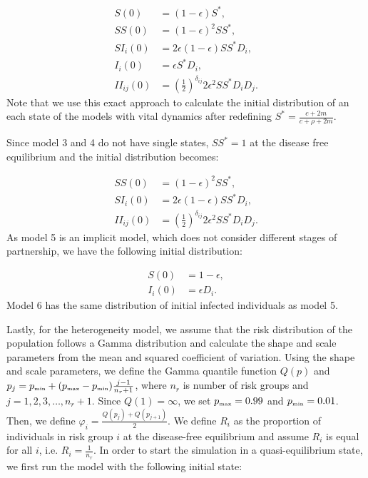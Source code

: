 \documentclass[10pt,letterpaper]{article}
\newcommand{\khalf}{\left(\frac{1}{2}\right)^{\delta_{ij}}}  %
\newcommand{\tsub}[2]{#1_{{\textrm{\tiny #2}}}}
\begin{document}
\begin{equation}
\begin{aligned}
S(0) &= (1 - \epsilon) S^*, \\
SS(0) &= (1 - \epsilon)^2 SS^*,\\
SI_i(0) &= 2 \epsilon (1-\epsilon) SS^* D_i,\\
I_i(0) &=  \epsilon S^* D_i,\\
II_{ij}(0) &=  \khalf 2\epsilon^2 SS^* D_i D_j.
\end{aligned}
\end{equation}
Note that we use this exact approach to calculate the initial distribution of an each state of the models with vital dynamics after redefining $S^* = \frac{c + 2m}{c + \rho + 2m}$.

Since model 3 and 4 do not have single states, $SS^*=1$ at the disease free equilibrium and the initial distribution becomes:

\begin{equation}
\begin{aligned}
SS(0) &= (1 - \epsilon)^2 SS^*,\\
SI_i(0) &= 2 \epsilon (1-\epsilon) SS^* D_i,\\
II_{ij}(0) &=  \khalf 2\epsilon^2 SS^* D_i D_j.
\end{aligned}
\end{equation}
As model 5 is an implicit model, which does not consider different stages of partnership, we have the following initial distribution:

\begin{equation}
\begin{aligned}
S(0) &= 1 - \epsilon,\\
I_i(0) &=  \epsilon D_i.
\end{aligned}
\end{equation}
Model 6 has the same distribution of initial infected individuals as model 5.

Lastly, for the heterogeneity model, we assume that the risk distribution of the population follows a Gamma distribution and calculate the shape and scale parameters from the mean and squared coefficient of variation. Using the shape and scale parameters, we define the Gamma quantile function $Q(p)$ and $p_j =  \tsub{p}{min} + (\tsub{p}{max} - \tsub{p}{min}) \frac{j-1}{n_r + 1}$, where $n_r$ is number of risk groups and $j = 1, 2, 3, \dots, n_r + 1$. Since $Q(1) = \infty$, we set $\tsub{p}{max} = 0.99$ and $\tsub{p}{min} = 0.01$. Then, we define $\varphi_i = \frac{Q(p_j) + Q(p_{j+1})}{2}$. We define $R_i$ as the proportion of individuals in risk group $i$ at the disease-free equilibrium and assume $R_i$ is equal for all $i$, i.e. $R_i = \frac{1}{n_r}$. In order to start the simulation in a quasi-equilibrium state, we first run the model with the following initial state:
\end{document}
